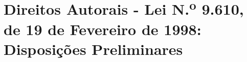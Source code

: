 
\anexos
\chapter{Direitos Autorais - Lei N\texorpdfstring{.\textsuperscript{o}}{o.} 9.610, de 19 de Fevereiro de 1998: Disposições Preliminares}\label{cap:anexoa}
